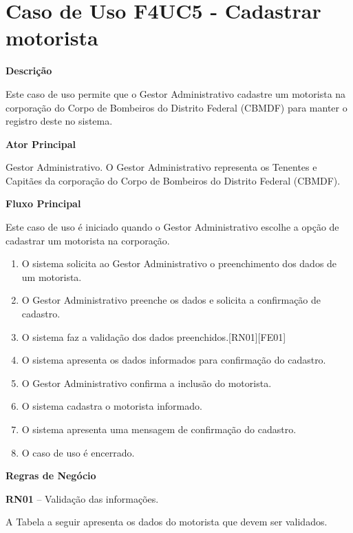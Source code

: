 
  \section{Caso de Uso F4UC5 - Cadastrar motorista}

  {\raggedright
      \textbf{Descrição}
  }

    Este caso de uso permite que o Gestor Administrativo cadastre um motorista na corporação do Corpo de Bombeiros do Distrito Federal
    (CBMDF) para manter o registro deste no sistema.
    
  {\raggedright
      \textbf{Ator Principal}
  }

    Gestor Administrativo. O Gestor Administrativo representa os Tenentes e Capitães da corporação do Corpo de Bombeiros do Distrito
    Federal (CBMDF).

  {\raggedright
      \textbf{Fluxo Principal}
  }
  
    Este caso de uso é iniciado quando o Gestor Administrativo escolhe a opção de cadastrar um motorista na corporação.
    
  
  \begin{enumerate}
    \item O sistema solicita ao Gestor Administrativo o preenchimento dos dados de um motorista.
    \item O Gestor Administrativo preenche os dados e solicita a confirmação de cadastro.
    \item O sistema faz a validação dos dados preenchidos.[RN01][FE01]
    \item O sistema apresenta os dados informados para confirmação do cadastro.
    \item O Gestor Administrativo confirma a inclusão do motorista.
    \item O sistema cadastra o motorista informado.
    \item O sistema apresenta uma mensagem de confirmação do cadastro.
    \item O caso de uso é encerrado.
    
  \end{enumerate}
  
  
   {\raggedright
      \textbf{Regras de Negócio}
   }
   
   \textbf{RN01} – Validação das informações.
   
   A Tabela a seguir apresenta os dados do motorista que devem ser validados.
   

